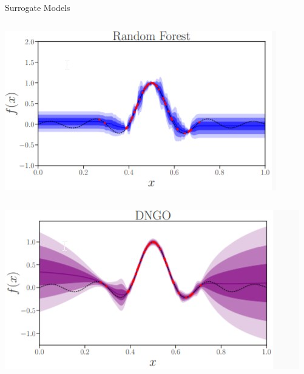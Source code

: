 \begin{frame}[c]{Surrogate Models}
\begin{columns}[T]
\begin{column}{.58\textwidth}
\begin{columns}[T]
\begin{column}{.48\textwidth}
    \includegraphics[width=1.\textwidth]{images/surrogate_models/uncertainty_forest.jpg}
\end{column}%
\end{columns}

\vspace*{\fill}
\begin{center}
  \includegraphics[width=.6\textwidth]{images/surrogate_models/uncertainty_dngo.jpg}
\end{center}
\vspace*{\fill}

\end{column}%
\end{columns}



\end{frame}
